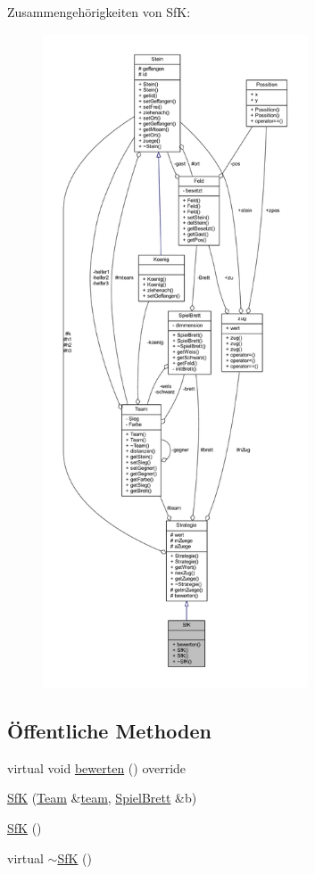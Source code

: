 Zusammengehörigkeiten von Sf\+K\+:\nopagebreak
\begin{figure}[H]
\begin{center}
\leavevmode
\includegraphics[height=550pt]{class_sf_k__coll__graph}
\end{center}
\end{figure}
\subsection*{Öffentliche Methoden}
\begin{DoxyCompactItemize}
\item 
virtual void \hyperlink{class_sf_k_a54410f0aa0c2f76704a0eb181a5737f0}{bewerten} () override
\item 
\hyperlink{class_sf_k_ae54f5f252db3e81aac89de1cdf4db5b2}{Sf\+K} (\hyperlink{class_team}{Team} \&\hyperlink{class_strategie_a4f55e74f189ec8c6df88a57119fb3def}{team}, \hyperlink{class_spiel_brett}{Spiel\+Brett} \&b)
\item 
\hyperlink{class_sf_k_a0b2852d8f0518f85092ec55db9ac3fd4}{Sf\+K} ()
\item 
virtual \hyperlink{class_sf_k_a5cd7cf22bfa7535a5a43a975595b73b7}{$\sim$\+Sf\+K} ()
\end{DoxyCompactItemize}
